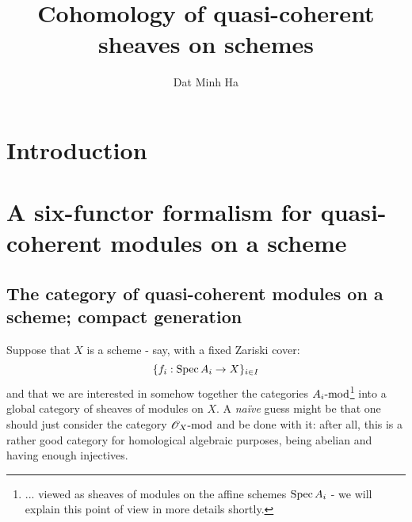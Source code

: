

\setcounter{section}{-1}





    \title{Cohomology of quasi-coherent sheaves on schemes}
    
    \author{Dat Minh Ha}
    \maketitle
    
    \begin{abstract}
        
    \end{abstract}
    
    {
      \hypersetup{} 
      \tableofcontents %
    }

    \section{Introduction}

    \section{A six-functor formalism for quasi-coherent modules on a scheme}
        \subsection{The category of quasi-coherent modules on a scheme; compact generation}
            Suppose that $X$ is a scheme - say, with a fixed Zariski cover:
                $$\{ f_i: \Spec A_i \to X \}_{i \in I}$$
            and that we are interested in somehow  together the categories $A_i\mod$\footnote{... viewed as sheaves of modules on the affine schemes $\Spec A_i$ - we will explain this point of view in more details shortly.} into a global category of sheaves of modules on $X$. A \textit{na\"ive} guess might be that one should just consider the category $\scrO_X\mod$ and be done with it: after all, this is a rather good category for homological algebraic purposes, being abelian and having enough injectives.
            
